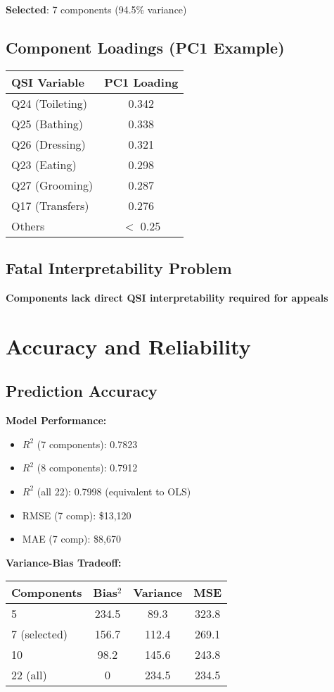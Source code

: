 \textbf{Selected}: 7 components (94.5\% variance)

\subsection{Component Loadings (PC1 Example)}

\begin{center}
\begin{tabular}{lc}
\toprule
QSI Variable & PC1 Loading \\
\midrule
Q24 (Toileting) & 0.342 \\
Q25 (Bathing) & 0.338 \\
Q26 (Dressing) & 0.321 \\
Q23 (Eating) & 0.298 \\
Q27 (Grooming) & 0.287 \\
Q17 (Transfers) & 0.276 \\
Others & $<$ 0.25 \\
\bottomrule
\end{tabular}
\end{center}

\subsection{Fatal Interpretability Problem}

\yellowwarning  \textbf{Components lack direct QSI interpretability required for appeals}

\section{Accuracy and Reliability}

\subsection{Prediction Accuracy}

\textbf{Model Performance:}
\begin{itemize}
    \item $R^2$ (7 components): 0.7823
    \item $R^2$ (8 components): 0.7912
    \item $R^2$ (all 22): 0.7998 (equivalent to OLS)
    \item RMSE (7 comp): \$13,120
    \item MAE (7 comp): \$8,670
\end{itemize}

\textbf{Variance-Bias Tradeoff:}
\begin{center}
\begin{tabular}{lccc}
\toprule
Components & Bias$^2$ & Variance & MSE \\
\midrule
5 & 234.5 & 89.3 & 323.8 \\
7 (selected) & 156.7 & 112.4 & 269.1 \\
10 & 98.2 & 145.6 & 243.8 \\
22 (all) & 0 & 234.5 & 234.5 \\
\bottomrule
\end{tabular}
\end{center}

